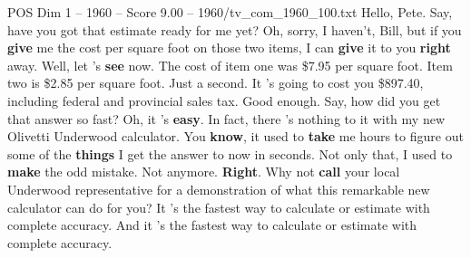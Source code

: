 \begin{textsample}{POS Dim 1 – 1960 – Score 9.00 – 1960/tv\_com\_1960\_100.txt}  \label{ex:f1_pos_023}
Hello, Pete.
Say, have you got that estimate ready for me yet?
Oh, sorry, I haven't, Bill, but if you \textbf{give} me the cost per square foot on those two items, I can \textbf{give} it to you \textbf{right} away.
Well, let 's \textbf{see} now.
The cost of item one was \$7.95 per square foot.
Item two is \$2.85 per square foot.
Just a second.
It 's going to cost you \$897.40, including federal and provincial sales tax.
Good enough.
Say, how did you get that answer so fast?
Oh, it 's \textbf{easy}.
In fact, there 's nothing to it with my new Olivetti Underwood calculator.
You \textbf{know}, it used to \textbf{take} me hours to figure out some of the \textbf{things} I get the answer to now in seconds.
Not only that, I used to \textbf{make} the odd mistake.
Not anymore. \textbf{Right}.
Why not \textbf{call} your local Underwood representative for a demonstration of what this remarkable new calculator can do for you?
It 's the fastest way to calculate or estimate with complete accuracy.
And it 's the fastest way to calculate or estimate with complete accuracy.

\end{textsample}
